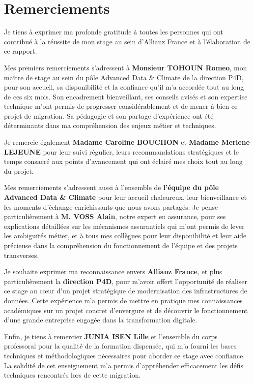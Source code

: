 \chapter*{Remerciements}

Je tiens à exprimer ma profonde gratitude à toutes les personnes qui ont contribué à la réussite de mon stage au sein d'Allianz France et à l'élaboration de ce rapport.

Mes premiers remerciements s'adressent à \textbf{Monsieur TOHOUN Romeo}, mon maître de stage au sein du pôle Advanced Data \& Climate de la direction P4D, pour son accueil, sa disponibilité et la confiance qu'il m'a accordée tout au long de ces six mois. Son encadrement bienveillant, ses conseils avisés et son expertise technique m'ont permis de progresser considérablement et de mener à bien ce projet de migration. Sa pédagogie et son partage d'expérience ont été déterminants dans ma compréhension des enjeux métier et techniques.

Je remercie également \textbf{Madame Caroline BOUCHON} et \textbf{Madame Merlene LEJEUNE} pour leur suivi régulier, leurs recommandations stratégiques et le temps consacré aux points d'avancement qui ont éclairé mes choix tout au long du projet.

Mes remerciements s'adressent aussi à l'ensemble de \textbf{l'équipe du pôle Advanced Data \& Climate} pour leur accueil chaleureux, leur bienveillance et les moments d'échange enrichissants que nous avons partagés. Je pense particulièrement à \textbf{M. VOSS Alain}, notre expert en assurance, pour ses explications détaillées sur les mécanismes assurantiels qui m'ont permis de lever les ambiguïtés métier, et à tous mes collègues pour leur disponibilité et leur aide précieuse dans la compréhension du fonctionnement de l'équipe et des projets transverses.

Je souhaite exprimer ma reconnaissance envers \textbf{Allianz France}, et plus particulièrement la \textbf{direction P4D}, pour m'avoir offert l'opportunité de réaliser ce stage au cœur d'un projet stratégique de modernisation des infrastructures de données. Cette expérience m'a permis de mettre en pratique mes connaissances académiques sur un projet concret d'envergure et de découvrir le fonctionnement d'une grande entreprise engagée dans la transformation digitale.

Enfin, je tiens à remercier \textbf{JUNIA ISEN Lille} et l'ensemble du corps professoral pour la qualité de la formation dispensée, qui m'a fourni les bases techniques et méthodologiques nécessaires pour aborder ce stage avec confiance. La solidité de cet enseignement m'a permis d'appréhender efficacement les défis techniques rencontrés lors de cette migration.
